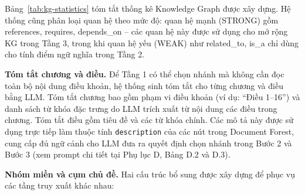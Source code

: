 Bảng~\ref{tab:kg-statistics} tóm tắt thống kê Knowledge Graph được xây dựng. Hệ
thống cũng phân loại quan hệ theo mức độ: quan hệ mạnh (STRONG) gồm references,
requires, depends\_on -- các quan hệ này được sử dụng cho mở rộng KG trong Tầng 3,
trong khi quan hệ yếu (WEAK) như related\_to, is\_a chỉ dùng cho tính điểm ngữ
nghĩa trong Tầng 2.

\begin{table}[htbp]
  \centering
  \caption{Thống kê Knowledge Graph}
  \label{tab:kg-statistics}
\end{table}

\textbf{Tóm tắt chương và điều.}
Để Tầng 1 có thể chọn nhánh mà không cần đọc toàn bộ nội dung điều khoản, hệ
thống sinh tóm tắt cho từng chương và điều bằng LLM. Tóm tắt chương bao gồm phạm
vi điều khoản (ví dụ: ``Điều 1--16'') và danh sách từ khóa đặc trưng do LLM trích
xuất từ nội dung các điều trong chương. Tóm tắt điều gồm tiêu đề và các từ khóa
chính. Các mô tả này được sử dụng trực tiếp làm thuộc tính \texttt{description}
của các nút trong Document Forest, cung cấp đủ ngữ cảnh cho LLM đưa ra quyết định
chọn nhánh trong Bước 2 và Bước 3 (xem prompt chi tiết tại Phụ lục D, Bảng D.2
và D.3).

\textbf{Nhóm miền và cụm chủ đề.}
Hai cấu trúc bổ sung được xây dựng để phục vụ các tầng truy xuất khác nhau:

